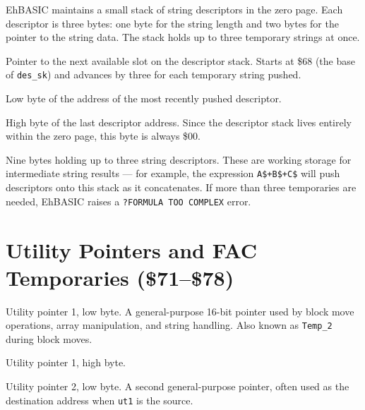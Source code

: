 EhBASIC maintains a small stack of string descriptors in the zero page.  Each
descriptor is three bytes: one byte for the string length and two bytes for
the pointer to the string data.  The stack holds up to three temporary strings
at once.


Pointer to the next available slot on the descriptor stack.  Starts at
\$68 (the base of \texttt{des\_sk}) and advances by three for each temporary
string pushed.


Low byte of the address of the most recently pushed descriptor.


High byte of the last descriptor address.  Since the descriptor stack lives
entirely within the zero page, this byte is always \$00.


Nine bytes holding up to three string descriptors.  These are working storage
for intermediate string results --- for example, the expression
\texttt{A\$+B\$+C\$} will push descriptors onto this stack as it concatenates.
If more than three temporaries are needed, EhBASIC raises a
\texttt{?FORMULA TOO COMPLEX} error.

\section{Utility Pointers and FAC Temporaries (\$71--\$78)}


Utility pointer 1, low byte.  A general-purpose 16-bit pointer used by block
move operations, array manipulation, and string handling.  Also known as
\texttt{Temp\_2} during block moves.


Utility pointer 1, high byte.


Utility pointer 2, low byte.  A second general-purpose pointer, often used as
the destination address when \texttt{ut1} is the source.


